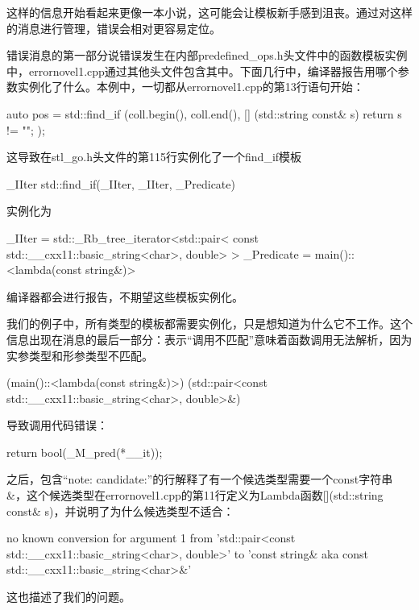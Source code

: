 这样的信息开始看起来更像一本小说，这可能会让模板新手感到沮丧。通过对这样的消息进行管理，错误会相对更容易定位。

错误消息的第一部分说错误发生在内部predefined\_ops.h头文件中的函数模板实例中，errornovel1.cpp通过其他头文件包含其中。下面几行中，编译器报告用哪个参数实例化了什么。本例中，一切都从errornovel1.cpp的第13行语句开始：

\begin{cpp}
auto pos = 
std::find_if (coll.begin(), coll.end(),
	[] (std::string const& s) {
		return s != "";
	});
\end{cpp}

这导致在stl\_go.h头文件的第115行实例化了一个find\_if模板

\begin{cpp}
_IIter std::find_if(_IIter, _IIter, _Predicate)
\end{cpp}

实例化为

\begin{cpp}
_IIter = std::_Rb_tree_iterator<std::pair<
	const std::__cxx11::basic_string<char>, double> >
_Predicate = main()::<lambda(const string&)>
\end{cpp}

编译器都会进行报告，不期望这些模板实例化。

我们的例子中，所有类型的模板都需要实例化，只是想知道为什么它不工作。这个信息出现在消息的最后一部分：表示“调用不匹配”意味着函数调用无法解析，因为实参类型和形参类型不匹配。

\begin{cpp}
(main()::<lambda(const string&)>) (std::pair<const std::__cxx11::basic_string<char>, double>&)
\end{cpp}

导致调用代码错误：

\begin{cpp}
{ return bool(_M_pred(*__it)); }
\end{cpp}

之后，包含“note: candidate:”的行解释了有一个候选类型需要一个const字符串\&，这个候选类型在errornovel1.cpp的第11行定义为Lambda函数[](std::string const\& s)，并说明了为什么候选类型不适合：

{\scriptsize
\begin{shell}
no known conversion for argument 1
from 'std::pair<const std::__cxx11::basic_string<char>, double>'
to 'const string& {aka const std::__cxx11::basic_string<char>&}'
\end{shell}
}

这也描述了我们的问题。

